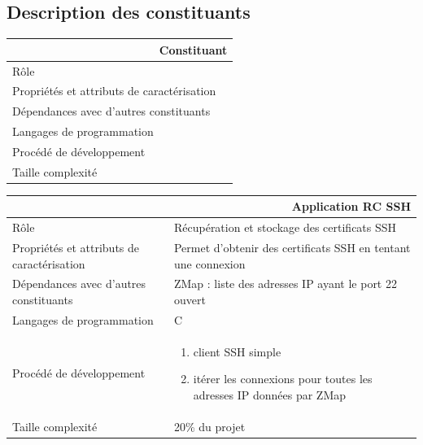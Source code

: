 \documentclass[a4paper,11pt,french]{article}
\begin{document}
\subsection{Description des constituants}
\begin{center}
	\vspace*{0.7cm}
	\begin{tabularx}{16cm}{|l|X|}
	\hline
	\multicolumn{2}{|r|}{\textbf{Constituant}}\\
	\hline
	R\^ole &  \\
	\hline
	Propriétés et attributs de caractérisation & \\
	\hline
	Dépendances avec d'autres constituants & \\
	\hline
	Langages de programmation & \\
	\hline
	Procédé de développement & \\
	\hline
	Taille complexité & \\
	\hline
	\end{tabularx}
\end{center}

\begin{center}
	\vspace*{0.7cm}
	\begin{tabularx}{16cm}{|l|X|}
	\hline
	\multicolumn{2}{|r|}{\textbf{Application RC SSH}}\\
	\hline
	R\^ole & Récupération et stockage des certificats SSH \\
	\hline
	Propriétés et attributs de caractérisation & Permet d'obtenir des certificats SSH en tentant une connexion  \\
	\hline
	Dépendances avec d'autres constituants & ZMap : liste des adresses IP ayant le port 22 ouvert\\
	\hline
	Langages de programmation & C \\
	\hline
	Procédé de développement & \begin{enumerate} \item client SSH simple \item itérer les connexions pour toutes les adresses IP données par ZMap \end{enumerate} \\
	\hline
	Taille complexité & 20\% du projet\\
	\hline
	\end{tabularx}
\end{center}
\end{document}
